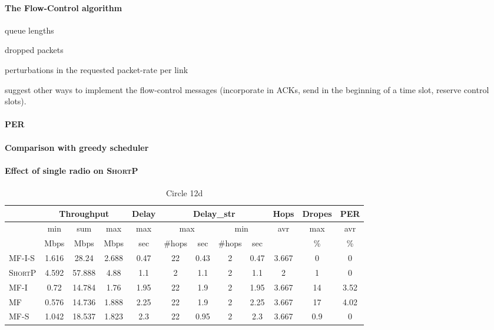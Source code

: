 \documentclass[12pt]{article}
\newenvironment{proof sketch}[1]{\noindent {\emph{Proof sketch of #1:}}}{\hfill \qed}
\newcommand{\algA}{\textsc{MF-I-S}}
\newcommand{\algB}{\textsc{ShortP}}
\newcommand{\algC}{\textsc{MF-I}}
\newcommand{\algD}{\textsc{MF}}
\newcommand{\algE}{\textsc{MF-S}}
\newcommand{\algS}{\algB}
\begin{document}
\paragraph{The Flow-Control algorithm}
queue lengths

dropped packets

perturbations in the requested packet-rate per link

suggest other ways to implement the flow-control messages (incorporate
in ACKs, send in the beginning of a time slot, reserve control slots).

\paragraph{PER}

\paragraph{Comparison with greedy scheduler}

\paragraph{Effect of single radio on \algS}





\begin{table}
\centering\small
\begin{tabular}{|| l || c | c | c | c|| c | c || c | c || c | c | c ||}
\hline
& \multicolumn{3}{|c|}{Throughput}  & Delay & \multicolumn{4}{|c||}{Delay\_str} & Hops & Dropes & PER \\
\hline
& min & sum & max & max & \multicolumn{2}{|c||}{max} & \multicolumn{2}{|c||}{min} & avr & max & avr \\
\hline
& Mbps & Mbps & Mbps & sec & \#hops & sec & \#hops & sec & & \% & \% \\
\hline\hline
\algA & 1.616 & 28.24  & 2.688 & 0.47 & 22 & 0.43 & 2 & 0.47 & 3.667 & 0   & 0 \\
\algB & 4.592 & 57.888 & 4.88  & 1.1  & 2  & 1.1  & 2 & 1.1  & 2     & 1   & 0 \\
\algC & 0.72  & 14.784 & 1.76  & 1.95 & 22 & 1.9  & 2 & 1.95 & 3.667 & 14  & 3.52 \\
\algD & 0.576 & 14.736 & 1.888 & 2.25 & 22 & 1.9  & 2 & 2.25 & 3.667 & 17  & 4.02 \\
\algE & 1.042 & 18.537 & 1.823 & 2.3  & 22 & 0.95 & 2 & 2.3  & 3.667 & 0.9 & 0 \\
\hline
\end{tabular}
\caption{Circle 12d}
\label{table_mcs}
\end{table}
\end{document}
